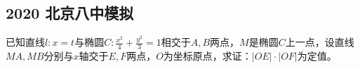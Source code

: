 \documentclass{ctexart}
\begin{document}
\subsection*{2020 北京八中模拟}
已知直线$l:x=t$与椭圆$C:\frac{x^{2}}{4}+\frac{y^{2}}{3}=1$相交于$A,B$两点，$M$是椭圆$C$上一点，设直线$MA,MB$分别与$x$轴交于$E,F$两点，$O$为坐标原点，求证：$|OE|\cdot|OF|$为定值。
\end{document}
